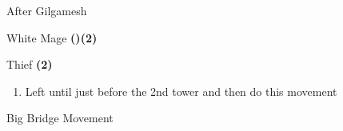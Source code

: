 \begin{paracol}{2}
\switchcolumnTwice[*]
\begin{menu}{After Gilgamesh}
    \varwb
    \begin{jobMenu}
        \bartz White Mage \textbf{(\pointDown)(2\pointRight)}
    \end{jobMenu}
    \begin{magicMenu}
        \bartz \life \space \then {}
        \bartz \cure \space \then {}
    \end{magicMenu}
    \begin{jobMenu}
        \bartz Thief \textbf{(2\pointRight)} \ability{!\escape}
    \end{jobMenu}
    \varwe
\end{menu}

\begin{enumerate}[resume]
    \item Left until just before the 2nd tower and then do this movement
\end{enumerate}

\switchcolumn
\begin{misc}{Big Bridge Movement}
\end{misc}

\end{paracol}